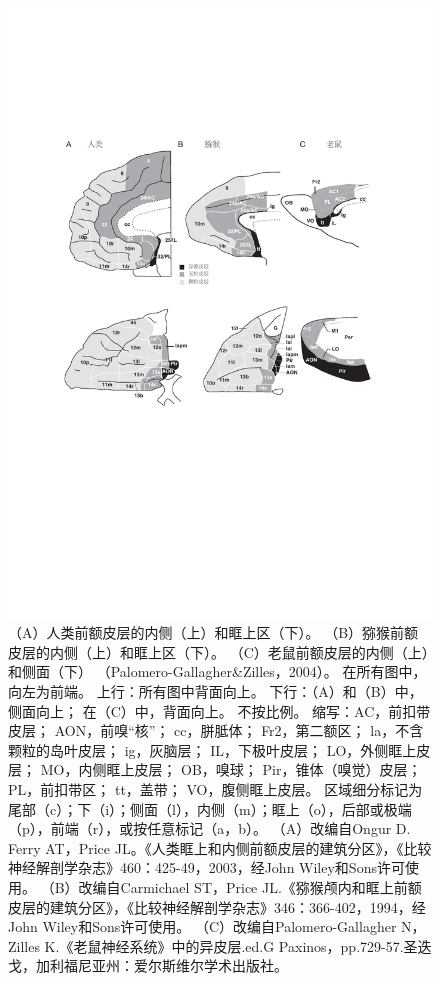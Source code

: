\begin{figure}[!htb]
	\centering
	\includegraphics[width=0.9\linewidth]{image_pfc/Fig_2_1}
	\caption{（A）人类前额皮层的内侧（上）和眶上区（下）\cite{ongur2003architectonic}。 
		（B）猕猴前额皮层的内侧（上）和眶上区（下）\cite{carmichael1994architectonic}。 
		（C）老鼠前额皮层的内侧（上）和侧面（下）
		（Palomero-Gallagher\&Zilles，2004）。
		在所有图中，向左为前端。
		上行：所有图中背面向上。
		下行：（A）和（B）中，侧面向上；
		在（C）中，背面向上。
		不按比例。
		缩写：AC，前扣带皮层；
		AON，前嗅“核”；
		cc，胼胝体；
		Fr2，第二额区；
		la，不含颗粒的岛叶皮层；
		ig，灰脑层；
		IL，下极叶皮层；
		LO，外侧眶上皮层；
		MO，内侧眶上皮层；
		OB，嗅球；
		Pir，锥体（嗅觉）皮层；
		PL，前扣带区；
		tt，盖带；
		VO，腹侧眶上皮层。
		区域细分标记为尾部（c）；下（i）；侧面（l），内侧（m）；眶上（o），后部或极端（p），前端（r），或按任意标记（a，b）。
		（A）改编自Ongur D. Ferry AT，Price JL。《人类眶上和内侧前额皮层的建筑分区》，《比较神经解剖学杂志》460：425-49，2003，经John Wiley和Sons许可使用。 
		（B）改编自Carmichael ST，Price JL.《猕猴颅内和眶上前额皮层的建筑分区》，《比较神经解剖学杂志》346：366-402，1994，经John Wiley和Sons许可使用。 
		（C）改编自Palomero-Gallagher N，Zilles K.《老鼠神经系统》中的异皮层.ed.G Paxinos，pp.729-57.圣迭戈，加利福尼亚州：爱尔斯维尔学术出版社。\label{fig:fig_2_1}}
\end{figure}

